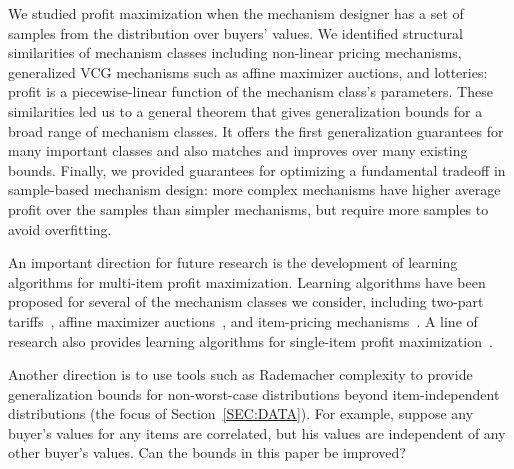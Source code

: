 We studied profit maximization when the mechanism designer has a set of samples from the distribution over buyers' values.  We identified structural similarities of mechanism classes including non-linear pricing mechanisms, generalized VCG mechanisms such as affine maximizer auctions, and lotteries: profit is a piecewise-linear function of the mechanism class's parameters. These similarities led us to a general theorem that gives generalization bounds for a broad range of mechanism classes. It offers the first generalization guarantees for many important classes and also matches and improves over many existing bounds.
Finally, we provided guarantees for optimizing a fundamental tradeoff in sample-based mechanism design: more complex mechanisms have higher average profit over the samples than simpler mechanisms, but require more samples to avoid overfitting.

An important direction for future research is the development of learning algorithms for multi-item profit maximization. Learning algorithms have been proposed for several of the mechanism classes we consider, including two-part tariffs~\citep{Balcan20:Efficient}, affine maximizer auctions~\citep{Sandholm15:Automated}, and item-pricing mechanisms~\citep[][who also provide algorithms for other multi-item mechanism classes]{Cai17:Learning}. A line of research also provides learning algorithms for single-item profit maximization~\citep{Devanur16:Sample,Hartline16:Non,Gonczarowski17:Efficient,Guo19:Settling}.

Another direction is to use tools such as Rademacher complexity to provide generalization bounds for non-worst-case distributions beyond item-independent distributions (the focus of Section~\ref{SEC:DATA}). For example, suppose any buyer's values for any items are correlated, but his values are independent of any other buyer's values. Can the bounds in this paper be improved?
